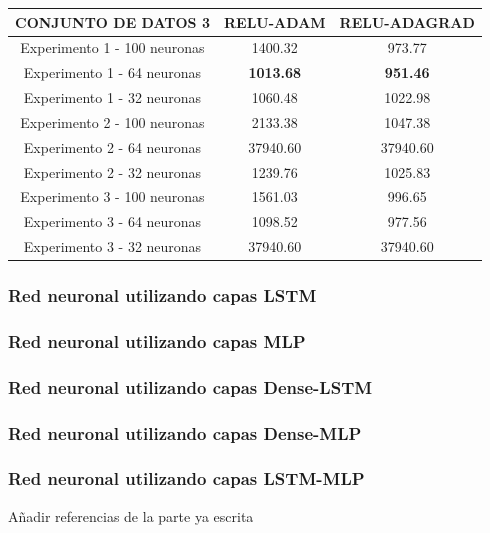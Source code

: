 \documentclass[11pt]{article} %
\begin{document}
\vspace{5ex}

\begin{tabular}{| c | c | c | }
	\hline
	CONJUNTO DE DATOS 3 & RELU-ADAM & RELU-ADAGRAD \\ \hline 
	Experimento 1 - 100 neuronas & 1400.32 & 973.77 \\ \hline 
	Experimento 1 - 64 neuronas & \textbf{1013.68} & \textbf{951.46} \\ \hline 
	Experimento 1 - 32 neuronas & 1060.48 & 1022.98 \\ \hline
	Experimento 2 - 100 neuronas & 2133.38 & 1047.38 \\ \hline 	
	Experimento 2 - 64 neuronas & 37940.60 & 37940.60 \\ \hline 
	Experimento 2 - 32 neuronas & 1239.76 & 1025.83 \\ \hline 
	Experimento 3 - 100 neuronas & 1561.03 & 996.65 \\ \hline
	Experimento 3 - 64 neuronas & 1098.52 & 977.56 \\ \hline 	
	Experimento 3 - 32 neuronas & 37940.60 & 37940.60 \\ \hline 
\end{tabular}



\subsubsection{Red neuronal utilizando capas LSTM}
\subsubsection{Red neuronal utilizando capas MLP}
\subsubsection{Red neuronal utilizando capas Dense-LSTM}
\subsubsection{Red neuronal utilizando capas Dense-MLP}
\subsubsection{Red neuronal utilizando capas LSTM-MLP}

\begin{thebibliography}{999999}
	
Añadir referencias de la parte ya escrita
		
\end{thebibliography}
\end{document}
